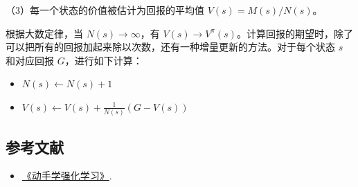 （3）每一个状态的价值被估计为回报的平均值 \(V(s)=M(s)/N(s)\)。

根据大数定律，当 \(N(s)\to\infty\)，有 \(V(s)\to V^\pi(s)\)。计算回报的期望时，除了可以把所有的回报加起来除以次数，还有一种增量更新的方法。对于每个状态 \(s\) 和对应回报 \(G\)，进行如下计算：

\begin{itemize}
\tightlist
\item
  \(N(s)\leftarrow N(s)+1\)
\item
  \(V(s)\leftarrow V(s)+\frac{1}{N(s)}(G-V(s))\)
\end{itemize}

\FloatBarrier
{}
\hypertarget{ux53c2ux8003ux6587ux732e-46}{%
\subsection{参考文献}\label{ux53c2ux8003ux6587ux732e-46}}

\vspace{0.25em}
\begin{itemize}
\tightlist
\item
  \href{https://hrl.boyuai.com/}{《动手学强化学习》}.
\end{itemize}

\clearpage
